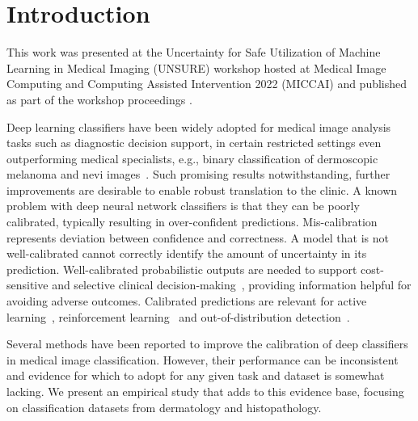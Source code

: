 \section{Introduction}
\label{sec:calibration_introduction}
This work was presented at the Uncertainty for Safe Utilization of Machine Learning in Medical Imaging (UNSURE) workshop hosted at Medical Image Computing and Computing Assisted Intervention 2022 (MICCAI) and published as part of the workshop proceedings \citep{carse2022calibration}.

Deep learning classifiers have been widely adopted for medical image analysis tasks such as diagnostic decision support, in certain restricted settings even outperforming medical specialists, e.g., binary classification of dermoscopic melanoma and nevi images~\citep{maron2019systematic}. Such promising results notwithstanding, further improvements are desirable to enable robust translation to the clinic. A known problem with deep neural network classifiers is that they can be poorly calibrated, typically resulting in over-confident predictions. Mis-calibration represents deviation between confidence and correctness. A model that is not well-calibrated cannot correctly identify the amount of uncertainty in its prediction. Well-calibrated probabilistic outputs are needed to support cost-sensitive and selective clinical decision-making~\citep{carse2021robust}, providing information helpful for avoiding adverse outcomes. Calibrated predictions are relevant for active learning~\citep{carse2019active}, reinforcement learning~\citep{dai2020federated} and out-of-distribution detection~\citep{ulmer2020trust}.

Several methods have been reported to improve the calibration of deep classifiers in medical image classification. However, their performance can be inconsistent and evidence for which to adopt for any given task and dataset is somewhat lacking. We present an empirical study that adds to this evidence base, focusing on classification datasets from dermatology and histopathology. 

